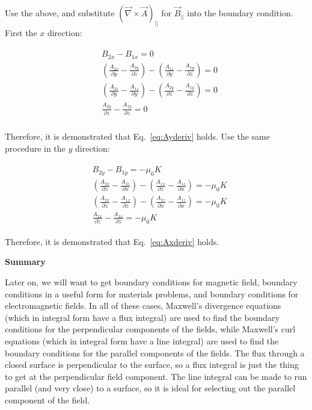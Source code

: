 \documentclass[12pt]{article}
\begin{document}
\begin{flushleft}
Use the above, and substitute $( \vec{\nabla} \times \vec{A} )_{||}$ for $\vec{B}_{||}$ into the boundary condition.  First the $x$ direction:

\begin{eqnarray*}
\begin{aligned}
& B_{2x} - B_{1x} = 0 \\
& \left( \frac{A_{2z}}{\partial y} -\frac{A_{2y}}{\partial z} \right) - \left( \frac{A_{1z}}{\partial y} -\frac{A_{1y}}{\partial z} \right)  = 0 \\
& \left( \frac{A_{2z}}{\partial y} -\frac{A_{1z}}{\partial y} \right) - \left( \frac{A_{2y}}{\partial z} -\frac{A_{1y}}{\partial z} \right) = 0 \\
& \frac{A_{2y}}{\partial z} -\frac{A_{1y}}{\partial z} = 0 \\
\end{aligned}
\end{eqnarray*}

Therefore, it is demonstrated that Eq.~\ref{eq:Ayderiv} holds.  Use the same procedure in the $y$ direction: 


\begin{eqnarray*}
\begin{aligned}
& B_{2y} - B_{1y} = -\mu_{0}K \\
& \left( \frac{A_{2x}}{\partial z} -\frac{A_{2z}}{\partial x} \right) - \left( \frac{A_{1x}}{\partial z} -\frac{A_{1z}}{\partial x} \right)  = -\mu_{0}K \\
& \left( \frac{A_{2x}}{\partial z} -\frac{A_{1x}}{\partial z} \right)  - \left( \frac{A_{2z}}{\partial x} -\frac{A_{1z}}{\partial x} \right)   = -\mu_{0}K  \\
& \frac{A_{2x}}{\partial z} -\frac{A_{1x}}{\partial z} = -\mu_{0}K
\end{aligned}
\end{eqnarray*}

Therefore, it is demonstrated that Eq.~\ref{eq:Axderiv} holds.

\vspace{.2in}
{\bf \color{myblue} Summary}

Later on, we will want to get boundary conditions for magnetic field, boundary conditions in a useful form for  materials problems, and boundary conditions for electromagnetic fields.  In all of these cases, Maxwell's divergence equations (which in integral form have a flux integral) are used to find the boundary conditions for the perpendicular components of the fields, while Maxwell's curl equations (which in integral form have a line integral) are used to find the boundary conditions for the parallel components of the fields.  The flux through a closed surface is perpendicular to the surface, so a flux integral is just the thing to get at the perpendicular field component.  The line integral can be made to run parallel (and very close) to a surface, so it is ideal for selecting out the parallel component of the field.


\end{flushleft}
\end{document}
